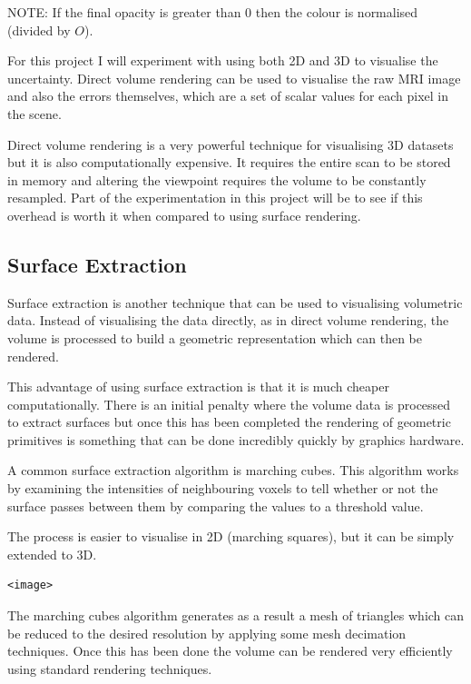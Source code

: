 \documentclass[
  oneside,
  11pt, a4paper,
  footinclude=true,
  headinclude=true,
  cleardoublepage=empty
]{scrbook}
\begin{document}
NOTE: If the final opacity is greater than 0 then the colour is normalised (divided by $O$).

For this project I will experiment with using both 2D and 3D to visualise the uncertainty. Direct volume rendering can be used to visualise the raw MRI image and also the errors themselves, which are a set of scalar values for each pixel in the scene.

Direct volume rendering is a very powerful technique for visualising 3D datasets but it is also computationally expensive. It requires the entire scan to be stored in memory and altering the viewpoint requires the volume to be constantly resampled. Part of the experimentation in this project will be to see if this overhead is worth it when compared to using surface rendering.

\newpage
\subsection{Surface Extraction}
Surface extraction is another technique that can be used to visualising volumetric data. Instead of visualising the data directly, as in direct volume rendering, the volume is processed to build a geometric representation which can then be rendered.

This advantage of using surface extraction is that it is much cheaper computationally\cite{surfacevsvolumerendering}. There is an initial penalty where the volume data is processed to extract surfaces but once this has been completed the rendering of geometric primitives is something that can be done incredibly quickly by graphics hardware.

A common surface extraction algorithm is marching cubes. This algorithm works by examining the intensities of neighbouring voxels to tell whether or not the surface passes between them by comparing the values to a threshold value. 

The process is easier to visualise in 2D (marching squares), but it can be simply extended to 3D.

\begin{verbatim}
<image>
\end{verbatim}

The marching cubes algorithm generates as a result a mesh of triangles which can be reduced to the desired resolution by applying some mesh decimation techniques. Once this has been done the volume can be rendered very efficiently using standard rendering techniques.
\end{document}
